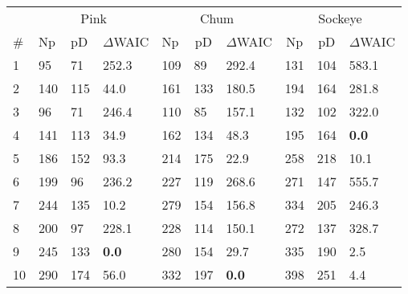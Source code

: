 \begin{tabular}{llllllllll}
  \hline
  \multicolumn{1}{r}{} &
            \multicolumn{3}{c}{Pink} &
            \multicolumn{3}{c}{Chum} &
            \multicolumn{3}{c}{Sockeye} \\ 
  \cmidrule(lr){2-4} \cmidrule(lr){5-7} \cmidrule(lr){8-10} 
  \multicolumn{1}{l}{\#} & 
    \multicolumn{1}{l}{Np} & 
    \multicolumn{1}{l}{pD} & 
    \multicolumn{1}{l}{$\Delta$WAIC} & 
    \multicolumn{1}{l}{Np} & 
    \multicolumn{1}{c}{pD} & 
    \multicolumn{1}{c}{$\Delta$WAIC} & 
    \multicolumn{1}{c}{Np} & 
    \multicolumn{1}{c}{pD} & 
    \multicolumn{1}{l}{$\Delta$WAIC} \\ 
  \cmidrule{1-10} 
1 & 95 & 71 & 252.3 & 109 & 89 & 292.4 & 131 & 104 & 583.1 \\ 
  2 & 140 & 115 & 44.0 & 161 & 133 & 180.5 & 194 & 164 & 281.8 \\ 
  3 & 96 & 71 & 246.4 & 110 & 85 & 157.1 & 132 & 102 & 322.0 \\ 
  4 & 141 & 113 & 34.9 & 162 & 134 & 48.3 & 195 & 164 & \textbf{0.0} \\ 
  5 & 186 & 152 & 93.3 & 214 & 175 & 22.9 & 258 & 218 & 10.1 \\ 
  6 & 199 & 96 & 236.2 & 227 & 119 & 268.6 & 271 & 147 & 555.7 \\ 
  7 & 244 & 135 & 10.2 & 279 & 154 & 156.8 & 334 & 205 & 246.3 \\ 
  8 & 200 & 97 & 228.1 & 228 & 114 & 150.1 & 272 & 137 & 328.7 \\ 
  9 & 245 & 133 & \textbf{0.0} & 280 & 154 & 29.7 & 335 & 190 & 2.5 \\ 
  10 & 290 & 174 & 56.0 & 332 & 197 & \textbf{0.0} & 398 & 251 & 4.4 \\ 
   \hline
\end{tabular}
